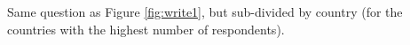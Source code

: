 \label{fig:write3}

Same question as Figure \ref{fig:write1}, but sub-divided by country (for the countries with the highest number of respondents).